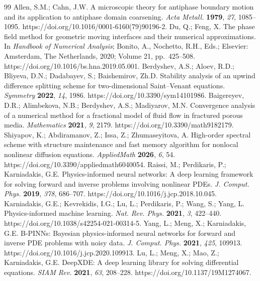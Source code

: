 
\begin{thebibliography}{99}
 Allen, S.M.; Cahn, J.W. A microscopic theory for antiphase boundary motion and its application to antiphase domain coarsening. \textit{Acta Metall.} \textbf{1979}, \textit{27}, 1085--1095. https://doi.org/10.1016/0001-6160(79)90196-2.
 Du, Q.; Feng, X. The phase field method for geometric moving interfaces and their numerical approximations. In \textit{Handbook of Numerical Analysis}; Bonito, A., Nochetto, R.H., Eds.; Elsevier: Amsterdam, The Netherlands, 2020; Volume 21, pp.\ 425--508. https://doi.org/10.1016/bs.hna.2019.05.001.
 Berdyshev, A.S.; Aloev, R.D.; Bliyeva, D.N.; Dadabayev, S.; Baishemirov, Zh.D. Stability analysis of an upwind difference splitting scheme for two-dimensional Saint--Venant equations. \textit{Symmetry} \textbf{2022}, \textit{14}, 1986. https://doi.org/10.3390/sym14101986.
 Baigereyev, D.R.; Alimbekova, N.B.; Berdyshev, A.S.; Madiyarov, M.N. Convergence analysis of a numerical method for a fractional model of fluid flow in fractured porous media. \textit{Mathematics} \textbf{2021}, \textit{9}, 2179. https://doi.org/10.3390/math9182179.
 Shiyapov, K.; Abdiramanov, Z.; Issa, Z.; Zhumaseyitova, A. High-order spectral scheme with structure maintenance and fast memory algorithm for nonlocal nonlinear diffusion equations. \textit{AppliedMath} \textbf{2026}, \textit{6}, 54. https://doi.org/10.3390/appliedmath6040054.
 Raissi, M.; Perdikaris, P.; Karniadakis, G.E. Physics-informed neural networks: A deep learning framework for solving forward and inverse problems involving nonlinear PDEs. \textit{J. Comput. Phys.} \textbf{2019}, \textit{378}, 686--707. https://doi.org/10.1016/j.jcp.2018.10.045.
 Karniadakis, G.E.; Kevrekidis, I.G.; Lu, L.; Perdikaris, P.; Wang, S.; Yang, L. Physics-informed machine learning. \textit{Nat. Rev. Phys.} \textbf{2021}, \textit{3}, 422--440. https://doi.org/10.1038/s42254-021-00314-5.
 Yang, L.; Meng, X.; Karniadakis, G.E. B-PINNs: Bayesian physics-informed neural networks for forward and inverse PDE problems with noisy data. \textit{J. Comput. Phys.} \textbf{2021}, \textit{425}, 109913. https://doi.org/10.1016/j.jcp.2020.109913.
 Lu, L.; Meng, X.; Mao, Z.; Karniadakis, G.E. DeepXDE: A deep learning library for solving differential equations. \textit{SIAM Rev.} \textbf{2021}, \textit{63}, 208--228. https://doi.org/10.1137/19M1274067.

\end{thebibliography}
